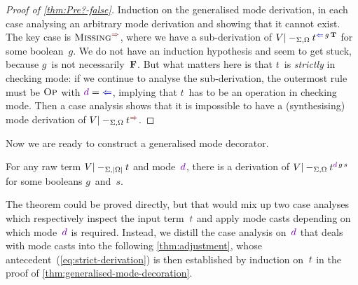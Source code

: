 \begin{proof}[Proof of \cref{thm:Pre?-false}]
Induction on the generalised mode derivation, in each case analysing an arbitrary mode derivation and showing that it cannot exist.
The key case is $\SynRule{Missing}$, where we have a sub-derivation of $V |-_{\Sigma,\Omega} t^{\chk\,g\,\BTrue}$ for some boolean~$g$.
We do not have an induction hypothesis and seem to get stuck, because $g$~is not necessarily~$\mathbf{F}$.
But what matters here is that $t$~is \emph{strictly} in checking mode: if we continue to analyse the sub-derivation, the outermost rule must be $\textnormal{\textsc{Op}}$ with $\dir d = {\chk}$, implying that $t$~has to be an operation in checking mode.
Then a case analysis shows that it is impossible to have a (synthesising) mode derivation of $V |-_{\Sigma,\Omega} t^{\syn}$.
\end{proof}

Now we are ready to construct a generalised mode decorator.

\begin{theorem}\label{thm:generalised-mode-decoration}
For any raw term $V |-_{\Sigma,\left|\Omega\right|} t$ and mode~$\dir{d}$, there is a derivation of\/ $V |-_{\Sigma,\Omega} t^{\dir{d}\,g\,s}$ for some booleans $g$~and~$s$.
\end{theorem}

The theorem could be proved directly, but that would mix up two case analyses which respectively inspect the input term~$\isTerm{t}$ and apply mode casts depending on which mode~$\dir{d}$ is required.
Instead, we distill the case analysis on~$\dir{d}$ that deals with mode casts into the following \cref{thm:adjustment}, whose antecedent~(\ref{eq:strict-derivation}) is then established by induction on~$\isTerm{t}$ in the proof of \cref{thm:generalised-mode-decoration}.

